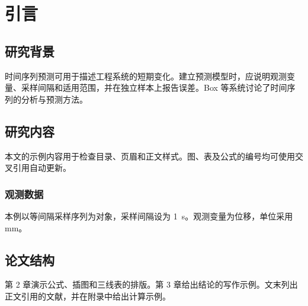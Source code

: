 \chapter{引言}
\section{研究背景}
时间序列预测可用于描述工程系统的短期变化。建立预测模型时，应说明观测变量、采样间隔和适用范围，并在独立样本上报告误差。Box 等\cite{box2015}系统讨论了时间序列的分析与预测方法。

\section{研究内容}
本文的示例内容用于检查目录、页眉和正文样式。图、表及公式的编号均可使用交叉引用自动更新。

\subsection{观测数据}
本例以等间隔采样序列为对象，采样间隔设为 \qty{1}{\second}。观测变量为位移，单位采用 \unit{\milli\metre}。

\clearpage
\section{论文结构}
第 2 章演示公式、插图和三线表的排版。第 3 章给出结论的写作示例。文末列出正文引用的文献，并在附录中给出计算示例。
